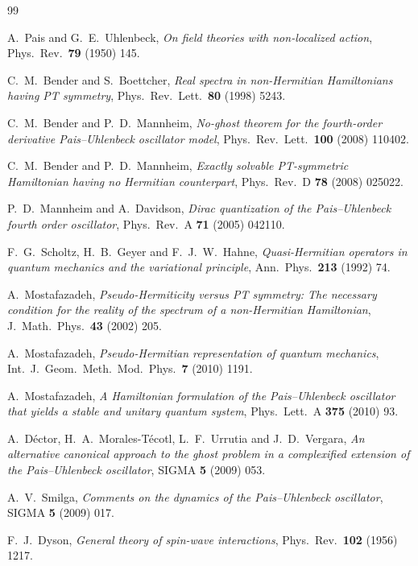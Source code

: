 \documentclass[11pt]{article}
\theoremstyle{definition}
\theoremstyle{remark}
\begin{document}
\begin{thebibliography}{99}

A.~Pais and G.~E.~Uhlenbeck,
\emph{On field theories with non-localized action},
Phys.\ Rev.\ \textbf{79} (1950) 145.

C.~M.~Bender and S.~Boettcher,
\emph{Real spectra in non-Hermitian Hamiltonians having PT symmetry},
Phys.\ Rev.\ Lett.\ \textbf{80} (1998) 5243.

C.~M.~Bender and P.~D.~Mannheim,
\emph{No-ghost theorem for the fourth-order derivative Pais--Uhlenbeck
oscillator model},
Phys.\ Rev.\ Lett.\ \textbf{100} (2008) 110402.

C.~M.~Bender and P.~D.~Mannheim,
\emph{Exactly solvable PT-symmetric Hamiltonian having no Hermitian
counterpart},
Phys.\ Rev.\ D \textbf{78} (2008) 025022.

P.~D.~Mannheim and A.~Davidson,
\emph{Dirac quantization of the Pais--Uhlenbeck fourth order oscillator},
Phys.\ Rev.\ A \textbf{71} (2005) 042110.

F.~G.~Scholtz, H.~B.~Geyer and F.~J.~W.~Hahne,
\emph{Quasi-Hermitian operators in quantum mechanics and the variational
principle},
Ann.\ Phys.\ \textbf{213} (1992) 74.

A.~Mostafazadeh,
\emph{Pseudo-Hermiticity versus PT symmetry: The necessary condition for the
reality of the spectrum of a non-Hermitian Hamiltonian},
J.\ Math.\ Phys.\ \textbf{43} (2002) 205.

A.~Mostafazadeh,
\emph{Pseudo-Hermitian representation of quantum mechanics},
Int.\ J.\ Geom.\ Meth.\ Mod.\ Phys.\ \textbf{7} (2010) 1191.

A.~Mostafazadeh,
\emph{A Hamiltonian formulation of the Pais--Uhlenbeck oscillator that yields
a stable and unitary quantum system},
Phys.\ Lett.\ A \textbf{375} (2010) 93.

A.~D\'ector, H.~A.~Morales-T\'ecotl, L.~F.~Urrutia and J.~D.~Vergara,
\emph{An alternative canonical approach to the ghost problem in a complexified
extension of the Pais--Uhlenbeck oscillator},
SIGMA \textbf{5} (2009) 053.

A.~V.~Smilga,
\emph{Comments on the dynamics of the Pais--Uhlenbeck oscillator},
SIGMA \textbf{5} (2009) 017.

F.~J.~Dyson,
\emph{General theory of spin-wave interactions},
Phys.\ Rev.\ \textbf{102} (1956) 1217.


\end{thebibliography}
\end{document}
